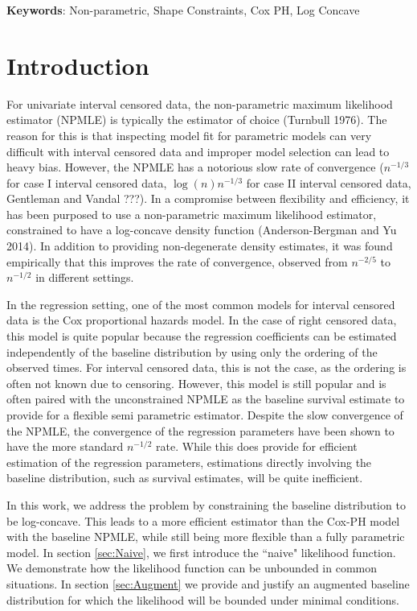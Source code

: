 \documentclass[11pt]{article}
\numberwithin{equation}{section}
\begin{document}
 {\bf Keywords}: Non-parametric, Shape Constraints, Cox PH, Log Concave

{\section{Introduction}  
\label{sec:Intro}	}			
	 	 
	For univariate interval censored data, the non-parametric maximum likelihood estimator (NPMLE) is typically the estimator of choice (Turnbull 1976). The reason for this is that inspecting model fit for parametric models can very difficult with interval censored data and improper model selection can lead to heavy bias. However, the NPMLE has a notorious slow rate of convergence ($n^{-1/3}$ for case I interval censored data, $\log(n) n^{-1/3}$ for case II interval censored data, Gentleman and Vandal ???). In a compromise between flexibility and efficiency, it has been purposed to use a non-parametric maximum likelihood estimator, constrained to have a log-concave density function (Anderson-Bergman and Yu 2014). In addition to providing non-degenerate density estimates, it was found empirically that this improves the rate of convergence, observed from $n^{-2/5}$ to $n^{-1/2}$ in different settings. 

	In the regression setting, one of the most common models for interval censored data is the Cox proportional hazards model. In the case of right censored data, this model is quite popular because the regression coefficients can be estimated independently of the baseline distribution by using only the ordering of the observed times. For interval censored data, this is not the case, as the ordering is often not known due to censoring. However, this model is still popular and is often paired with the unconstrained NPMLE as the baseline survival estimate to provide for a flexible semi parametric estimator. Despite the slow convergence of the NPMLE, the convergence of the regression parameters have been shown to have the more standard $n^{-1/2}$ rate. While this does provide for efficient estimation of the regression parameters, estimations directly involving the baseline distribution, such as survival estimates, will be quite inefficient. 
	
	In this work, we address the problem by constraining the baseline distribution to be log-concave. This leads to a more efficient estimator than the Cox-PH model with the baseline NPMLE, while still being more flexible than a fully parametric model. In section \ref{sec:Naive}, we first introduce the ``naive" likelihood function. We demonstrate how the likelihood function can be unbounded in common situations. In section \ref{sec:Augment} we provide and justify an augmented baseline distribution for which the likelihood will be bounded under minimal conditions. 
		 
\end{document}
